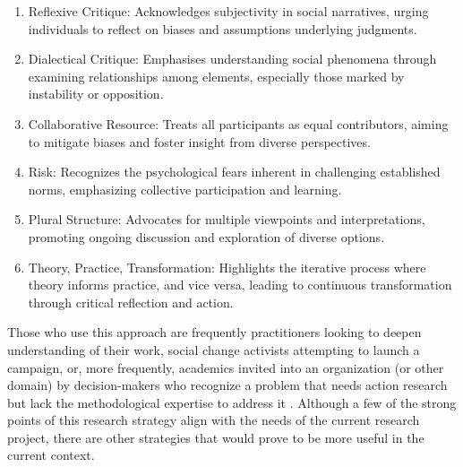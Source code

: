 \begin{enumerate}
        \item Reflexive Critique: Acknowledges subjectivity in social narratives, urging individuals to reflect on biases and assumptions underlying judgments.
        \item Dialectical Critique: Emphasises understanding social phenomena through examining relationships among elements, especially those marked by instability or opposition.
        \item Collaborative Resource: Treats all participants as equal contributors, aiming to mitigate biases and foster insight from diverse perspectives.
        \item Risk: Recognizes the psychological fears inherent in challenging established norms, emphasizing collective participation and learning.
        \item Plural Structure: Advocates for multiple viewpoints and interpretations, promoting ongoing discussion and exploration of diverse options.
        \item Theory, Practice, Transformation: Highlights the iterative process where theory informs practice, and vice versa, leading to continuous transformation through critical reflection and action.
\end{enumerate}
\par{Those who use this approach are frequently practitioners looking to deepen understanding of their work, social change activists attempting to launch a campaign, or, more frequently, academics invited into an organization (or other domain) by decision-makers who recognize a problem that needs action research but lack the methodological expertise to address it \citep{o1998overview}. Although a few of the strong points of this research strategy align with the needs of the current research project, there are other strategies that would prove to be more useful in the current context.}
